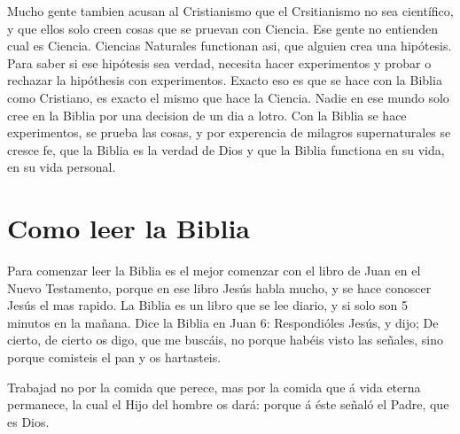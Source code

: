 Mucho gente tambien acusan al Cristianismo que el Crsitianismo no sea
científico, y que ellos solo creen cosas que se pruevan con Ciencia. Ese
gente no entienden cual es Ciencia. Ciencias Naturales functionan asi,
que alguien crea una hipótesis. Para saber si ese hipótesis sea verdad,
necesita hacer experimentos y probar o rechazar la hipóthesis con
experimentos. Exacto eso es que se hace con la Biblia como Cristiano, es
exacto el mismo que hace la Ciencia. Nadie en ese mundo solo cree en la
Biblia por una decision de un dia a l\textquotesingle otro. Con la
Biblia se hace experimentos, se prueba las cosas, y por experencia de
milagros supernaturales se cresce fe, que la Biblia es la verdad de Dios
y que la Biblia functiona en su vida, en su vida personal.

\hypertarget{como-leer-la-biblia}{%
\section{Como leer la Biblia}\label{como-leer-la-biblia}}

Para comenzar leer la Biblia es el mejor comenzar con el libro de Juan
en el Nuevo Testamento, porque en ese libro Jesús habla mucho, y se hace
conoscer Jesús el mas rapido. La Biblia es un libro que se lee diario, y
si solo son 5 minutos en la mañana. Dice la Biblia en Juan 6:
 Respondióles Jesús, y dijo; De cierto, de cierto os
digo, que me buscáis, no porque habéis visto las señales, sino porque
comisteis el pan y os hartasteis.

 Trabajad no por la comida que perece, mas por la comida
que á vida eterna permanece, la cual el Hijo del hombre os dará: porque
á éste señaló el Padre, que es Dios.

